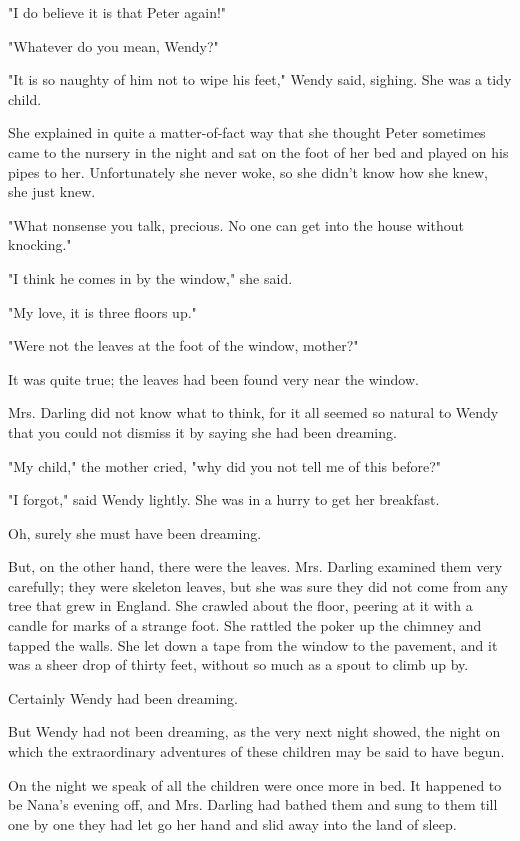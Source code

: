 "I do believe it is that Peter again!"


"Whatever do you mean, Wendy?"


"It is so naughty of him not to wipe his feet," Wendy said, sighing. She
was a tidy child.


She explained in quite a matter-of-fact way that she thought Peter
sometimes came to the nursery in the night and sat on the foot of her bed
and played on his pipes to her. Unfortunately she never woke, so she
didn't know how she knew, she just knew.


"What nonsense you talk, precious. No one can get into the house without
knocking."


"I think he comes in by the window," she said.


"My love, it is three floors up."


"Were not the leaves at the foot of the window, mother?"


It was quite true; the leaves had been found very near the window.


Mrs. Darling did not know what to think, for it all seemed so natural to
Wendy that you could not dismiss it by saying she had been dreaming.


"My child," the mother cried, "why did you not tell me of this before?"


"I forgot," said Wendy lightly. She was in a hurry to get her breakfast.


Oh, surely she must have been dreaming.


But, on the other hand, there were the leaves. Mrs. Darling examined them
very carefully; they were skeleton leaves, but she was sure they did not
come from any tree that grew in England. She crawled about the floor,
peering at it with a candle for marks of a strange foot. She rattled the
poker up the chimney and tapped the walls. She let down a tape from the
window to the pavement, and it was a sheer drop of thirty feet, without so
much as a spout to climb up by.


Certainly Wendy had been dreaming.


But Wendy had not been dreaming, as the very next night showed, the night
on which the extraordinary adventures of these children may be said to
have begun.


On the night we speak of all the children were once more in bed. It
happened to be Nana's evening off, and Mrs. Darling had bathed them and
sung to them till one by one they had let go her hand and slid away into
the land of sleep.


